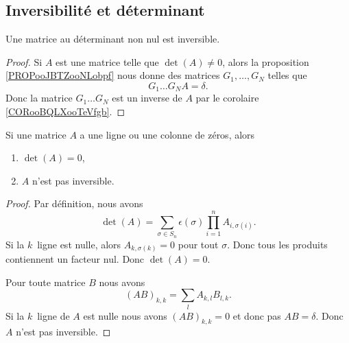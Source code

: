 \subsection{Inversibilité et déterminant}

\begin{proposition}     \label{PROPooAVIXooMtVCet}
	Une matrice au déterminant non nul est inversible.
\end{proposition}

\begin{proof}
	Si \( A\) est une matrice telle que \( \det(A)\neq 0\), alors la proposition \ref{PROPooJBTZooNLobpf} nous donne des matrices \( G_1,\ldots, G_N\) telles que
	\begin{equation}
		G_1\ldots G_NA=\delta.
	\end{equation}
	Donc la matrice \( G_1\ldots G_N\) est un inverse de \( A\) par le corolaire \ref{CORooBQLXooTeVfgb}.
\end{proof}

\begin{proposition}     \label{PROPooEOKBooKUROFg}
	Si une matrice \( A\) a une ligne ou une colonne de zéros, alors
	\begin{enumerate}
		\item
		      \( \det(A)=0\),
		\item
		      \( A\) n'est pas inversible.
	\end{enumerate}
\end{proposition}

\begin{proof}
	Par définition, nous avons
	\begin{equation}
		\det(A)=\sum_{\sigma\in S_n}\epsilon(\sigma)\prod_{i=1}^n A_{i,\sigma(i)}.
	\end{equation}
	Si la \( k\)\ieme\ ligne est nulle, alors \( A_{k,\sigma(k)}=0\) pour tout \( \sigma\). Donc tous les produits contiennent un facteur nul. Donc \( \det(A)=0\).

	Pour toute matrice \( B\) nous avons
	\begin{equation}
		(AB)_{k,k}=\sum_l A_{k,l}B_{l,k}.
	\end{equation}
	Si la \( k\)\ieme\ ligne de \( A\) est nulle nous avons \( (AB)_{k,k}=0\) et donc pas \( AB=\delta\). Donc \( A\) n'est pas inversible.
\end{proof}

